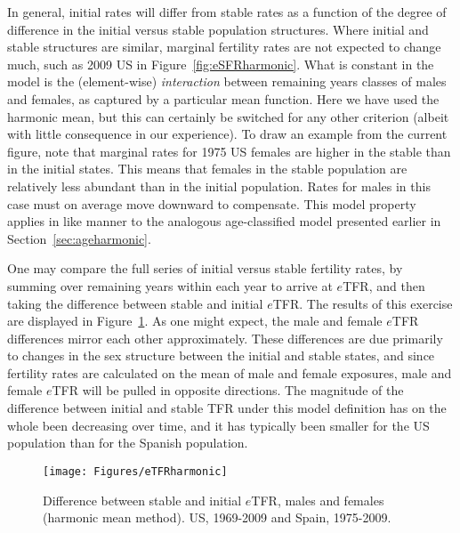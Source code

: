 In general, initial rates will differ from stable rates as a function of the
degree of difference in the initial versus stable population structures. Where
initial and stable structures are similar, marginal fertility rates are not
expected to change much, such as 2009 US in Figure~\ref{fig:eSFRharmonic}. What
is constant in the model is the (element-wise) \textit{interaction} between
remaining years classes of males and females, as captured by a particular mean function.
Here we have used the harmonic mean, but
this can certainly be switched for any other criterion (albeit with little
consequence in our experience). To draw an example from the current figure, note
that marginal rates for 1975 US females are higher in the stable than in the
initial states. This means that females in the stable population are relatively
less abundant than in the initial population. Rates for males in this case must
on average move downward to compensate. This model property applies in like 
manner to the analogous age-classified model
presented earlier in Section~\ref{sec:ageharmonic}.

One may compare the full series of initial versus stable fertility rates, by
summing over remaining years within each year to arrive at $e$TFR, and then
taking the difference between stable and initial $e$TFR. The results of this
exercise are displayed in Figure~\ref{fig:eTFRharmonic}. As one might expect,
the male and female $e$TFR differences mirror each other approximately. These
differences are due primarily to changes in the sex structure between the initial and stable
states, and since fertility rates are calculated on the mean of male and female
exposures, male and female $e$TFR will be pulled in opposite directions. The
magnitude of the difference between initial and stable TFR under this model
definition has on the whole been decreasing over time, and it has typically been
smaller for the US population than for the Spanish population.

\begin{figure}[ht!]
        \centering  
          \caption{Difference between stable and initial $e$TFR, males and
          females (harmonic mean method). US, 1969-2009 and Spain,
          1975-2009.}
           \texttt{[image: Figures/eTFRharmonic]}
          \label{fig:eTFRharmonic}
\end{figure}

\FloatBarrier
